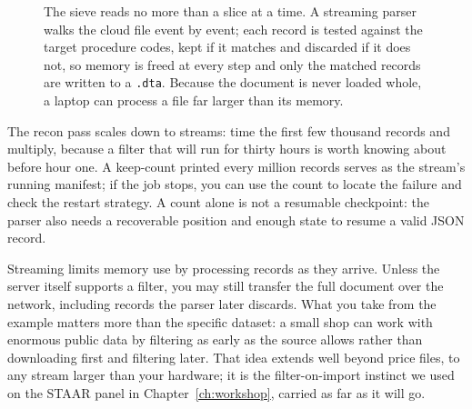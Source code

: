\begin{figure}[htbp]
\centering
{}
\caption[The streaming sieve]{The sieve reads no more than a slice at a time.
A streaming parser walks the cloud file event by event; each record is
tested against the target procedure codes, kept if it matches and
discarded if it does not, so memory is freed at every step and only the
matched records are written to a \texttt{.dta}. Because the document is
never loaded whole, a laptop can process a file far larger than its
memory.}
\label{fig:ch04-viz-sieve}
\end{figure}

The recon pass scales down to streams: time the first few thousand records and multiply, because a filter that will run for thirty hours is worth knowing about before hour one. A keep-count printed every million records serves as the stream's running manifest; if the job stops, you can use the count to locate the failure and check the restart strategy. A count alone is not a resumable checkpoint: the parser also needs a recoverable position and enough state to resume a valid JSON record.

Streaming limits memory use by processing records as they arrive. Unless the server itself supports a filter, you may still transfer the full document over the network, including records the parser later discards. What you take from the example matters more than the specific dataset: a small shop can work with enormous public data by filtering as early as the source allows rather than downloading first and filtering later. That idea extends well beyond price files, to any stream larger than your hardware; it is the filter-on-import instinct we used on the STAAR panel in Chapter~\ref{ch:workshop}, carried as far as it will go.


